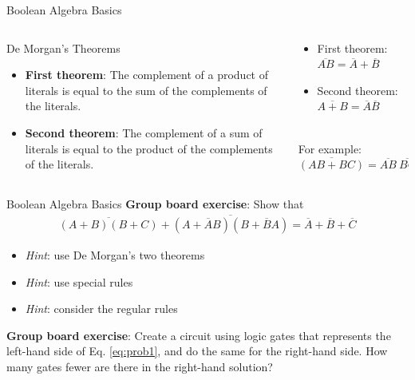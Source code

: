 \documentclass{beamer}
\begin{document}
\begin{frame}{Boolean Algebra Basics}
\begin{columns}[T]
\begin{column}{0.5\textwidth}
De Morgan's Theorems \\ \hrulefill
\begin{itemize}
\small
\item \textbf{First theorem}: The complement of a product of literals is equal to the sum of the complements of the literals.
\item \textbf{Second theorem}: The complement of a sum of literals is equal to the product of the complements of the literals.
\end{itemize}
\end{column}
\begin{column}{0.5\textwidth}
\begin{itemize}
\item First theorem: $\overline{AB} = \overline{A}+\overline{B}$
\item Second theorem: $\overline{A+B} = \overline{A}\overline{B}$
\end{itemize} \hrulefill \\
For example: \\ 
$\overline{(AB+BC)} = \overline{AB}~\overline{BC} = (\overline{A}+\overline{B})(\overline{B}+\overline{C})$
\end{column}
\end{columns}
\end{frame}

\begin{frame}{Boolean Algebra Basics}
\small
\textbf{Group board exercise}: Show that
\begin{equation}
\begin{multlined}
\boxed{
\overline{(A+B)(B+C)}+\overline{(A+\overline{A}B)(B+\overline{B}A)}=\overline{A}+\overline{B}+\overline{C}} \label{eq:prob1}
\end{multlined}
\end{equation}
\begin{itemize}
\item \textit{Hint}: use De Morgan's two theorems
\item \textit{Hint}: use special rules
\item \textit{Hint}: consider the regular rules
\end{itemize}
\textbf{Group board exercise}: Create a circuit using logic gates that represents the left-hand side of Eq. \ref{eq:prob1}, and do the same for the right-hand side.  How many gates fewer are there in the right-hand solution?
\end{frame}
\end{document}
